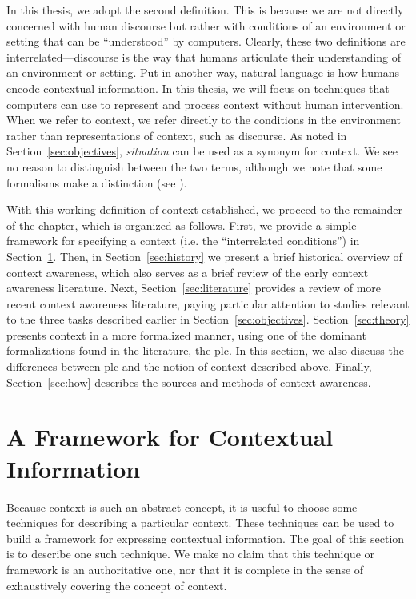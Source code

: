 In this thesis, we adopt the second definition. This is because we are not directly concerned with human discourse but rather with conditions of an environment or setting that can be ``understood'' by computers. Clearly, these two definitions are interrelated---discourse is the way that humans articulate their understanding of an environment or setting. Put in another way, natural language is how humans encode contextual information. In this thesis, we will focus on techniques that computers can use to represent and process context without human intervention. When we refer to context, we refer directly to the conditions in the environment rather than representations of context, such as discourse. As noted in Section~\ref{sec:objectives}, \emph{situation} can be used as a synonym for context. We see no reason to distinguish between the two terms, although we note that some formalisms make a distinction (see \cite{akman1996steps}).

With this working definition of context established, we proceed to the remainder of the chapter, which is organized as follows. First, we provide a simple framework for specifying a context (i.e. the ``interrelated conditions'') in Section~\ref{sec:framework}. Then, in Section~\ref{sec:history} we present a brief historical overview of context awareness, which also serves as a brief review of the early context awareness literature. Next, Section~\ref{sec:literature} provides a review of more recent context awareness literature, paying particular attention to studies relevant to the three tasks described earlier in Section~\ref{sec:objectives}. Section~\ref{sec:theory} presents context in a more formalized manner, using one of the dominant formalizations found in the literature, the \gls{plc}. In this section, we also discuss the differences between \gls{plc} and the notion of context described above. Finally, Section~\ref{sec:how} describes the sources and methods of context awareness.

\section{A Framework for Contextual Information}
\label{sec:framework}

Because context is such an abstract concept, it is useful to choose some techniques for describing a particular context. These techniques can be used to build a framework for expressing contextual information. The goal of this section is to describe one such technique. We make no claim that this technique or framework is an authoritative one, nor that it is complete in the sense of exhaustively covering the concept of context.

